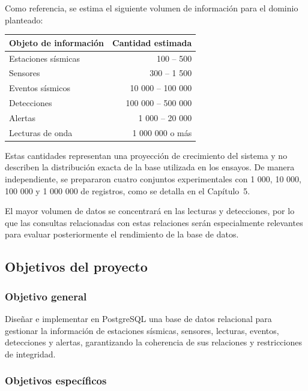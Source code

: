 \documentclass[12pt,a4paper]{article}
\begin{document}
Como referencia, se estima el siguiente volumen de información para el dominio planteado:

\begin{table}[H]
\centering
\begin{tabular}{lr}
\toprule
\textbf{Objeto de información} & \textbf{Cantidad estimada} \\
\midrule
Estaciones sísmicas & 100 -- 500 \\
Sensores & 300 -- 1 500 \\
Eventos sísmicos & 10 000 -- 100 000 \\
Detecciones & 100 000 -- 500 000 \\
Alertas & 1 000 -- 20 000 \\
Lecturas de onda & 1 000 000 o más \\
\bottomrule
\end{tabular}
\end{table}

Estas cantidades representan una proyección de crecimiento del sistema y no describen la distribución exacta de la base utilizada en los ensayos. De manera independiente, se prepararon cuatro conjuntos experimentales con 1 000, 10 000, 100 000 y 1 000 000 de registros, como se detalla en el Capítulo~5.

El mayor volumen de datos se concentrará en las lecturas y detecciones, por lo que las consultas relacionadas con estas relaciones serán especialmente relevantes para evaluar posteriormente el rendimiento de la base de datos.


\subsection{Objetivos del proyecto}

\subsubsection*{Objetivo general}

Diseñar e implementar en PostgreSQL una base de datos relacional para gestionar la información de estaciones sísmicas, sensores, lecturas, eventos, detecciones y alertas, garantizando la coherencia de sus relaciones y restricciones de integridad.

\subsubsection*{Objetivos específicos}
\end{document}
